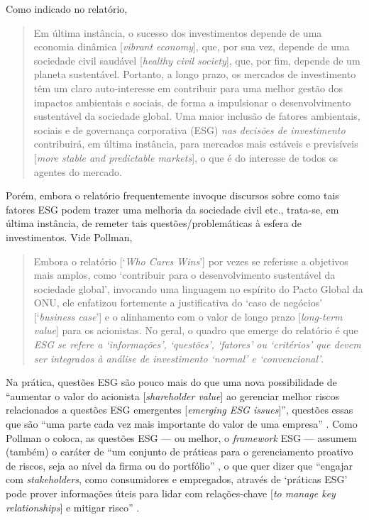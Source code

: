 \documentclass[12pt]{article}
\numberwithin{equation}{section}
\theoremstyle{plain}
\theoremstyle{definition}
\theoremstyle{remark}
\begin{document}
Como indicado no relatório,
\begin{quote}
    Em última instância, o sucesso dos investimentos depende de uma economia dinâmica [\textit{vibrant economy}], que, por sua vez, depende de uma sociedade civil saudável [\textit{healthy civil society}], que, por fim, depende de um planeta sustentável. Portanto, a longo prazo, os mercados de investimento têm um claro auto-interesse em contribuir para uma melhor gestão dos impactos ambientais e sociais, de forma a impulsionar o desenvolvimento sustentável da sociedade global. Uma maior inclusão de fatores ambientais, sociais e de governança corporativa (ESG) \textit{nas decisões de investimento} contribuirá, em última instância, para mercados mais estáveis e previsíveis [\textit{more stable and predictable markets}], o que é do interesse de todos os agentes do mercado. \parencite[p. 3, grifo meu]{GlobalCompact2004}
\end{quote}

Porém, embora o relatório frequentemente invoque discursos sobre como tais fatores ESG podem trazer uma melhoria da sociedade civil etc., trata-se, em última instância, de remeter tais questões/problemáticas à esfera de investimentos. Vide Pollman, 
\begin{quote}
    Embora o relatório [`\textit{Who Cares Wins}'] por vezes se referisse a objetivos mais amplos, como `contribuir para o desenvolvimento sustentável da sociedade global', invocando uma linguagem no espírito do Pacto Global da ONU, ele enfatizou fortemente a justificativa do `caso de negócios' [`\textit{business case}'] e o alinhamento com o valor de longo prazo [\textit{long-term value}] para os acionistas. No geral, o quadro que emerge do relatório é que \textit{ESG se refere a `informações', `questões', `fatores' ou `critérios' que devem ser integrados à análise de investimento `normal' e `convencional'}. \parencite[p. 20-1, grifo meu]{Pollman2022}    
\end{quote}




Na prática, questões ESG são pouco mais do que uma nova possibilidade de ``aumentar o valor do acionista [\textit{shareholder value}] ao gerenciar melhor riscos relacionados a questões ESG emergentes [\textit{emerging ESG issues}]'', questões essas que são ``uma parte cada vez mais importante do valor de uma empresa'' \parencite[p. 9]{GlobalCompact2004}. Como Pollman o coloca, as questões ESG --- ou melhor, o \textit{framework} ESG --- assumem (também) o caráter de ``um conjunto de práticas para o gerenciamento proativo de riscos, seja ao nível da firma ou do portfólio'' \parencite[p. 24]{Pollman2022}, o que quer dizer que ``engajar com \textit{stakeholders}, como consumidores e empregados, através de `práticas ESG' pode prover informações úteis para lidar com relações-chave [\textit{to manage key relationships}] e mitigar risco'' \parencite[p. 23]{Pollman2022}.
\end{document}
